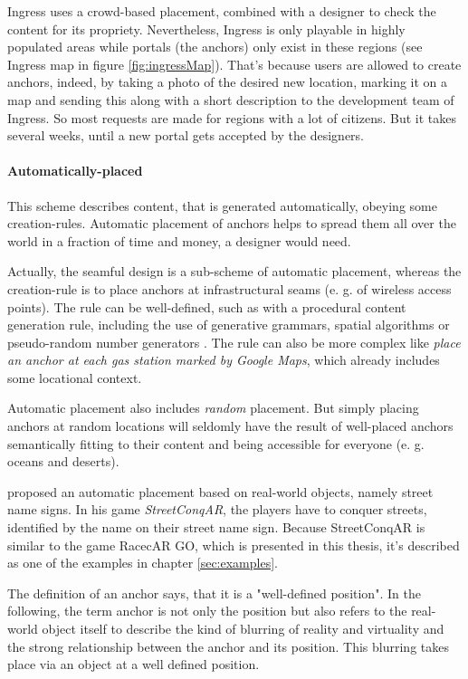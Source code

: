 Ingress uses a crowd-based placement, combined with a designer to check the content for its propriety. Nevertheless, Ingress is only playable in highly populated areas while portals (the anchors) only exist in these regions (see Ingress map in figure \ref{fig:ingressMap}). That's because users are allowed to create anchors, indeed, by taking a photo of the desired new location, marking it on a map and sending this along with a short description to the development team of Ingress. So most requests are made for regions with a lot of citizens. But it takes several weeks, until a new portal gets accepted by the designers.

\paragraph{Automatically-placed}
This scheme describes content, that is generated automatically, obeying some creation-rules. Automatic placement of anchors helps to spread them all over the world in a fraction of time and money, a designer would need.

Actually, the seamful design is a sub-scheme of automatic placement, whereas the creation-rule is to place anchors at infrastructural seams (e. g. of wireless access points).
The rule can be well-defined, such as with a procedural content generation rule, including the use of generative grammars, spatial algorithms or pseudo-random number generators \citep{carraca2014procedural}.
The rule can also be more complex like \emph{place an anchor at each gas station marked by Google Maps}, which already includes some locational context.

Automatic placement also includes \emph{random} placement. But simply placing anchors at random locations will seldomly have the result of well-placed anchors semantically fitting to their content and being accessible for everyone (e. g. oceans and deserts).

\citeauthor{hock2014augmented} proposed an automatic placement based on real-world objects, namely street name signs. In his game \emph{StreetConqAR}, the players have to conquer streets, identified by the name on their street name sign. Because StreetConqAR is similar to the game RacecAR GO, which is presented in this thesis, it's described as one of the examples in chapter \ref{sec:examples}.

The definition of an anchor says, that it is a "well-defined position". In the following, the term anchor is not only the position but also refers to the real-world object itself to describe the kind of blurring of reality and virtuality and the strong relationship between the anchor and its position. This blurring takes place via an object at a well defined position.


